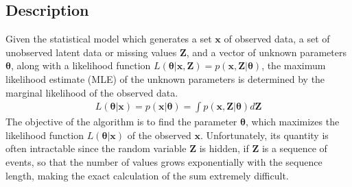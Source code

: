\subsection{Description}


Given the statistical model which generates a set $\boldsymbol x$ of observed data, a set of unobserved latent data or missing values $\mathbf{Z}$, and a vector of unknown parameters $\boldsymbol\theta$, along with a likelihood function $L(\boldsymbol\theta|\boldsymbol x, \mathbf{Z}) = p(\boldsymbol x, \mathbf{Z} | \boldsymbol\theta)$, the maximum likelihood estimate (MLE) of the unknown parameters is determined by the marginal likelihood of the observed data.
\begin{align}
	\label{ep:em_L}
	L(\boldsymbol \theta | \boldsymbol x) = p(\boldsymbol x| \boldsymbol \theta) = \int p(\boldsymbol x,\mathbf{Z}| \boldsymbol \theta) d\mathbf{Z}
\end{align}
The objective of the algorithm is to find the parameter $\boldsymbol \theta$, which maximizes the likelihood function $L(\boldsymbol \theta | \boldsymbol x)$ of the observed $\boldsymbol x$. Unfortunately, its quantity is often intractable since the random variable $\mathbf{Z}$ is hidden, if $\mathbf{Z}$ is a sequence of events, so that the number of values grows exponentially with the sequence length, making the exact calculation of the sum extremely difficult. 

